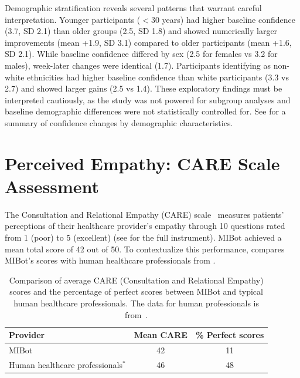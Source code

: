 Demographic stratification reveals several patterns that warrant careful interpretation. Younger participants ($<30$ years) had higher baseline confidence (3.7, SD 2.1) than older groups (2.5, SD 1.8) and showed numerically larger improvements (mean +1.9, SD 3.1) compared to older participants (mean +1.6, SD 2.1). While baseline confidence differed by sex (2.5 for females vs 3.2 for males), week-later changes were identical (1.7). Participants identifying as non-white ethnicities had higher baseline confidence than white participants (3.3 vs 2.7) and showed larger gains (2.5 vs 1.4). These exploratory findings must be interpreted cautiously, as the study was not powered for subgroup analyses and baseline demographic differences were not statistically controlled for. See  for a summary of confidence changes by demographic characteristics.


\section{Perceived Empathy: CARE Scale Assessment}
\label{sec:perceived-empathy}

The Consultation and Relational Empathy (CARE) scale~\citep{10.1093/fampra/cmh621} measures patients' perceptions of their healthcare provider's empathy through 10 questions rated from 1 (poor) to 5 (excellent) (see  for the full instrument). MIBot achieved a mean total score of 42 out of 50. To contextualize this performance,  compares MIBot's scores with human healthcare professionals from \citet{Bikker2015}.

\begin{table}[ht]
	\centering
	\small
	\setlength{\tabcolsep}{4pt}
	\renewcommand{\arraystretch}{1.1}
	\begin{tabular}{@{}lcc@{}}
		\toprule
		\textbf{Provider}                  & \textbf{Mean CARE} & \textbf{\% Perfect scores} \\
		\midrule
		MIBot                              & 42                 & 11                         \\
		Human healthcare professionals$^*$ & 46                 & 48                         \\
		\bottomrule
	\end{tabular}
	\caption[MIBot vs. Human CARE Scores]{Comparison of average CARE (Consultation and Relational Empathy) scores and the percentage of perfect scores between MIBot and typical human healthcare professionals. The data for human professionals is from~\cite{Bikker2015}.}
	\label{table:care_comparison}
\end{table}

